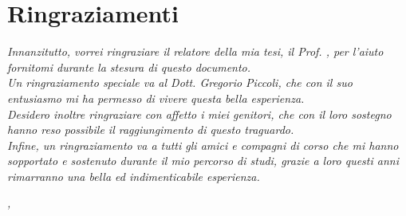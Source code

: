 
\cleardoublepage
{}
{}




\begingroup
\let\clearpage\relax
\let\cleardoublepage\relax
\let\cleardoublepage\relax

\chapter*{Ringraziamenti}

\noindent \textit{Innanzitutto, vorrei ringraziare il relatore della mia tesi, il Prof. \myProf, per l'aiuto fornitomi durante la stesura di questo documento.}\\

\noindent \textit{Un ringraziamento speciale va al Dott. Gregorio Piccoli, che con il suo entusiasmo mi ha permesso di vivere questa bella esperienza.}\\

\noindent \textit{Desidero inoltre ringraziare con affetto i miei genitori, che con il loro sostegno hanno reso possibile il raggiungimento di questo traguardo.}\\

\noindent \textit{Infine, un ringraziamento va a tutti gli amici e compagni di corso che mi hanno sopportato e sostenuto durante il mio percorso di studi, grazie a loro questi anni rimarranno una bella ed indimenticabile esperienza.}\\

\bigskip

\noindent\textit{\myLocation, \myTime}
\hfill \myName

\endgroup

